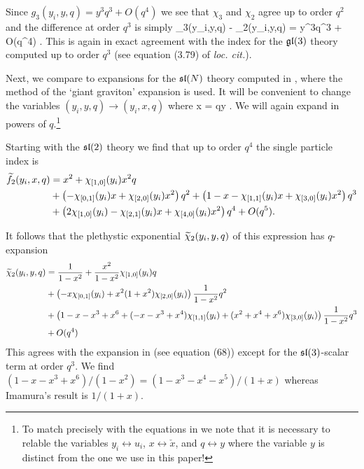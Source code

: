 Since $g_3(y_i,y,q) = y^3 q^3 + O(q^4)$ we see that $\chi_3$ and $\chi_2$ agree up to order $q^2$ and the difference at order $q^3$ is simply
\beqn
\chi_3(y_i,y,q) - \chi_2(y_i,y,q) = y^3q^3 + O(q^4) .
\eeqn
This is again in exact agreement with the index for the $\mathfrak{gl}(3)$ theory computed \cite{Kim:2013nva} up to order $q^3$ (see equation (3.79) of \textit{loc. cit.}). 

\parsec

Next, we compare to expansions for the $\mathfrak{sl}(N)$ theory computed in \cite{Imamura}, where the method of the `giant graviton' expansion is used.
It will be convenient to change the variables $(y_i, y, q) \to (y_i,x,q)$ where 
\beqn
x = qy .
\eeqn 
We will again expand in powers of $q$.\footnote{To match precisely with the equations in \cite{Imamura} we note that it is necessary to relable the variables $y_i \leftrightarrow u_i$, $x \leftrightarrow \check{x}$, and $q \leftrightarrow y$ where the variable $y$ is distinct from the one we use in this paper!}

Starting with the $\mathfrak{sl}(2)$ theory we find that up to order $q^4$ the single particle index is
\begin{align*}
\widetilde f_2 (y_i,x,q) & = x^2 + \chi_{[1,0]}(y_i) x^2 q \\
& + \left(-\chi_{[0,1]}(y_i) x + \chi_{[2,0]}(y_i) x^2 \right) q^2 +  \left(1-x-\chi_{[1,1]}(y_i) x + \chi_{[3,0]}(y_i) x^2 \right) q^3 \\
& + \left(2 \chi_{[1,0]}(y_i) - \chi_{[2,1]}(y_i) x + \chi_{[4,0]}(y_i)x^2 \right)q^4 + O(q^5) .
\end{align*}

It follows that the plethystic exponential $\widetilde \chi_2(y_i,y,q)$ of this expression has $q$-expansion
\begin{align*}
\widetilde \chi_2(y_i,y,q) & = \frac{1}{1-x^2} +  \frac{x^2}{1-x^2} \chi_{[1,0]}(y_i) q \\
& + \left(- x \chi_{[0,1]}(y_i) +  x^2 (1+x^2)\chi_{[2,0]}(y_i)\right) \frac{1}{1-x^2} q^2 \\ 
& + \left( 1 - x - x^3 + x^6 + (-x - x^3 + x^4) \chi_{[1,1]}(y_i)  + (x^2 + x^4 + x^6)\chi_{[3,0]}(y_i)  \right) \frac{1}{1-x^2} q^3 \\
& + O(q^4) 
\end{align*}
This agrees with the expansion in \cite{Imamura} (see equation (68)) except for the $\mathfrak{sl}(3)$-scalar term at order $q^3$. 
We find $(1-x-x^3+x^6) / (1-x^2) = (1-x^3-x^4-x^5) / (1+x)$ whereas Imamura's result is $1 / (1+x)$. 

